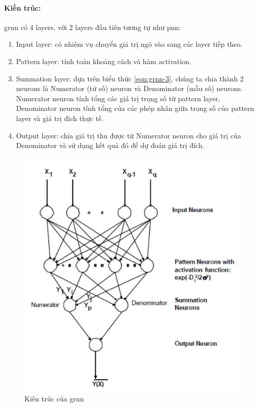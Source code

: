 \paragraph{Kiến trúc:}\ac{grnn} có 4 layers, với 2 layers đầu tiên tương tự như \ac{pnn}:
\begin{enumerate}
	\item Input layer: có nhiệm vụ chuyển giá trị ngõ vào sang các layer tiếp theo.
	\item Pattern layer: tính toán khoảng cách và hàm activation.
	\item Summation layer: dựa trên biểu thức \ref{eqn:grnn-3}, chúng ta chia thành 2 neurons là Numerator (tử số) neuron và Denominator (mẫu số) neurons. Numerator neuron tính tổng các giá trị trọng số từ pattern layer, Denominator neuron tính tổng của các phép nhân giữa trọng số của pattern layer và giá trị đích thực tế.
	\item Output layer: chia giá trị thu được từ Numerator neuron cho giá trị của Denominator và sử dụng kết quả đó để dự đoán giá trị đích.
\end{enumerate}
\begin{figure} [ht]
	\centering
	\captionsetup{justification=centering}
	\includegraphics [scale=0.8] {Image/GRNN_model}
	\caption{Kiến trúc của \ac{grnn}}
\end{figure}
